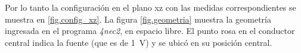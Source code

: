Por lo tanto la configuración en el plano xz con las medidas correspondientes se muestra en \ref{fig.config_xz}. La figura \ref{fig.geometria} muestra la geometría ingresada en el programa \textit{4nec2}, en espacio libre. El punto rosa en el conductor central indica la fuente (que es de \SI{1}{\volt}) y se ubicó en su posición central.   







